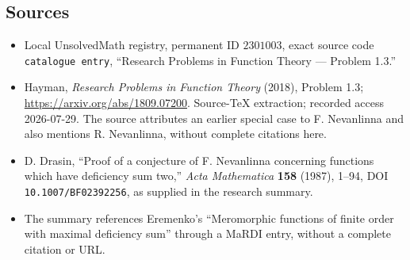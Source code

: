 \documentclass[11pt]{article}
\begin{document}
\subsection{Sources}
\begin{itemize}
\item Local UnsolvedMath registry, permanent ID \(2301003\), exact source code \texttt{catalogue entry}, ``Research Problems in Function Theory --- Problem 1.3.''
\item Hayman, \emph{Research Problems in Function Theory} (2018), Problem 1.3; \url{https://arxiv.org/abs/1809.07200}. Source-TeX extraction; recorded access 2026-07-29. The source attributes an earlier special case to F. Nevanlinna and also mentions R. Nevanlinna, without complete citations here.
\item D. Drasin, ``Proof of a conjecture of F. Nevanlinna concerning functions which have deficiency sum two,'' \emph{Acta Mathematica} \textbf{158} (1987), 1--94, DOI \texttt{10.1007/BF02392256}, as supplied in the research summary.
\item The summary references Eremenko's ``Meromorphic functions of finite order with maximal deficiency sum'' through a MaRDI entry, without a complete citation or URL.
\end{itemize}
\end{document}
